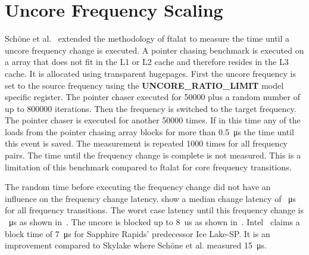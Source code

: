 \section{Uncore Frequency Scaling}
\label{sec:uncore_frequency_scaling}
Schöne et al.~\cite{Schoene_2019_SKL} extended the methodology of ftalat to measure the time until a uncore frequency change is executed.
A pointer chasing benchmark is executed on a array that does not fit in the L1 or L2 cache and therefore resides in the L3 cache.
It is allocated using transparent hugepages.
First the uncore frequency is set to the source frequency using the \textbf{UNCORE\_RATIO\_LIMIT} model specific register.
The pointer chaser executed for \SI{50000}{} plus a random number of up to \SI{800000}{} iterations.
Then the frequency is switched to the target frequency.
The pointer chaser is executed for another \SI{50000}{} times.
If in this time any of the loads from the pointer chasing array blocks for more than \SI{0.5}{\us} the time until this event is saved.
The measurement is repeated \SI{1000}{} times for all frequency pairs.
The time until the frequency change is complete is not measured.
This is a limitation of this benchmark compared to ftalat for core frequency transitions.

The random time before executing the frequency change did not have an influence on the frequency change latency.
 show a median change latency of \SI{}{\us} for all frequency transitions.
The worst case latency until this frequency change is \SI{}{\us} as shown in~.
The uncore is blocked up to \SI{8}{us} as shown in~.
Intel~\cite{Intel_2020_IceLake_SP} claims a block time of \SI{7}{\us} for Sapphire Rapids' predecessor Ice Lake-SP.
It is an improvement compared to Skylake where Schöne et al. measured \SI{15}{\us}.

